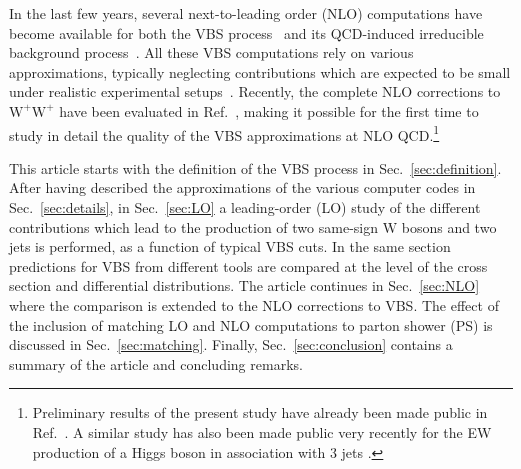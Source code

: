 \documentclass[twocolumn,epjc3]{svjour3} %
\newcommand{\PW}{\ensuremath{\text{W}}\xspace}
\begin{document}
In the last few years, several next-to-leading order (NLO) computations have become available for both the VBS process~\cite{Jager:2006zc,Jager:2006cp,Bozzi:2007ur,Jager:2009xx,Jager:2011ms,Denner:2012dz,Rauch:2016pai} and its QCD-induced irreducible background process~\cite{Rauch:2016pai,Melia:2010bm,Melia:2011gk,Campanario:2013gea,Baglio:2014uba}.
All these VBS computations rely on various approximations, typically neglecting contributions which are expected to be small under realistic experimental setups~\cite{Denner:2012dz,Oleari:2003tc}.
Recently, the complete NLO corrections to $\PW^+\PW^+$ have been evaluated in Ref.~\cite{Biedermann:2017bss}, 
making it possible for the first time to study in detail the quality of the VBS approximations at NLO QCD.\footnote{Preliminary results of the present study have already been made public in Ref.~\cite{Anders:2018gfr}. 
A similar study has also been made public very recently for the EW production of a Higgs boson in association with 3 jets \cite{Campanario:2018ppz}.}

This article starts with the definition of the VBS process in Sec.~\ref{sec:definition}.
After having described the approximations of the various computer 
codes in Sec.~\ref{sec:details}, in Sec.~\ref{sec:LO} a leading-order (LO) study 
of the different contributions which lead to the production of two same-sign $\PW$ bosons and 
two jets is performed, as a function of typical VBS cuts. In the same section predictions for VBS from different tools are compared at 
the level of the cross section and differential distributions. The article continues in Sec.~\ref{sec:NLO} where the comparison is extended to the
NLO corrections to VBS. The effect of the inclusion of matching LO and NLO computations to parton shower (PS) is 
discussed in Sec.~\ref{sec:matching}. Finally,
Sec.~\ref{sec:conclusion} contains a summary of the article and concluding remarks.
\end{document}
